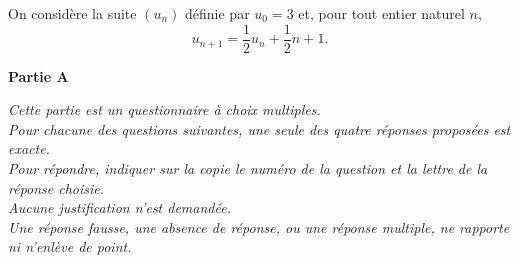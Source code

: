 \medskip

On considère la suite $\left(u_n\right)$ définie par $u_0 = 3$ et, pour tout entier naturel $n$,
\[u_{n+1} = \dfrac12u_n + \dfrac12n + 1.\]

\bigskip

\textbf{Partie A}

\medskip

\emph{Cette partie est un questionnaire à choix multiples.\\ Pour chacune des questions suivantes, une seule des quatre réponses proposées est exacte.\\Pour répondre, indiquer sur la copie le numéro de la question et la lettre de la réponse choisie.\\Aucune justification n'est demandée.\\Une réponse fausse, une absence de réponse, ou une réponse multiple, ne rapporte ni n'enlève de point.}

\medskip

